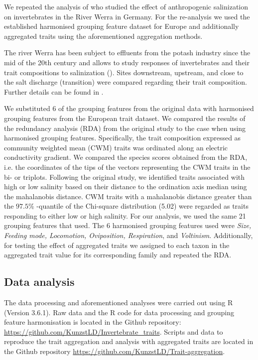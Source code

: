 \documentclass{article}
\begin{document}
We repeated the analysis of \citet{szocs_effects_2014} who studied the effect of anthropogenic salinization on invertebrates in the River Werra in Germany. For the re-analysis we used the established harmonised grouping feature dataset for Europe and additionally aggregated traits using the aforementioned aggregation methods. 

The river Werra has been subject to effluents from the potash industry since the mid of the 20th century and allows to study responses of invertebrates and their trait compositions to salinization (\cite{bathe_biological_2011}). Sites downstream, upstream, and close to the salt discharge (transition) were compared regarding their trait composition. Further details can be found in \citet{szocs_effects_2014}. 

We substituted 6 of the grouping features from the original data with harmonised grouping features from the European trait dataset. We compared the results of the redundancy analysis (RDA) from the original study to the case when using harmonised grouping features. Specifically, the trait composition expressed as community weighted mean (CWM) traits was ordinated along an electric conductivity gradient. We compared the species scores obtained from the RDA, i.e. the coordinates of the tips of the vectors representing the CWM traits in the bi- or triplots. Following the original study, we identified traits associated with high or low salinity based on their distance to the ordination axis median using the mahalanobis distance. CWM traits with a mahalanobis distance greater than the $97.5 \%$ -quantile of the Chi-square distribution (5.02) were regarded as traits responding to either low or high salinity. For our analysis, we used the same 21 grouping features that \citet{szocs_effects_2014} used. The 6 harmonised grouping features used were \textit{Size, Feeding mode, Locomotion, Oviposition, Respiration}, and \textit{Voltinism}. Additionally, for testing the effect of aggregated traits we assigned to each taxon in \citet{szocs_effects_2014} the aggregated trait value for its corresponding family and repeated the RDA.  


\subsection*{Data analysis}

The data processing and aforementioned analyses were carried out using R (Version 3.6.1). Raw data and the R code for data processing and grouping feature harmonisation is located in the Github repository: \url{https://github.com/KunzstLD/Invertebrate_traits}. Scripts and data to reproduce the trait aggregation and analysis with aggregated traits are located in the Github repository \url{https://github.com/KunzstLD/Trait-aggregation}.
\end{document}
